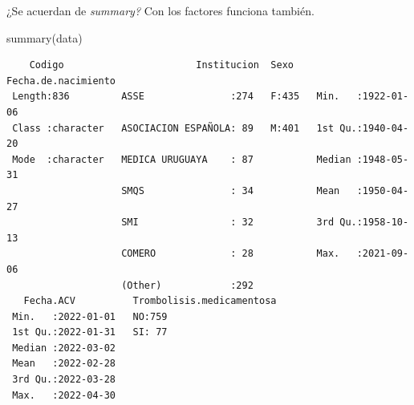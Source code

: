 \documentclass[
  letterpaper,
  DIV=11,
  numbers=noendperiod]{scrreprt}
\newenvironment{Shaded}{\begin{snugshade}}{\end{snugshade}}
\newcommand{\FunctionTok}[1]{\textcolor[rgb]{0.28,0.35,0.67}{#1}}
\newcommand{\NormalTok}[1]{\textcolor[rgb]{0.00,0.23,0.31}{#1}}
\newcommand{\OtherTok}[1]{\textcolor[rgb]{0.00,0.23,0.31}{#1}}
\newcommand{\SpecialCharTok}[1]{\textcolor[rgb]{0.37,0.37,0.37}{#1}}
\begin{document}
\begin{Shaded}
\end{Shaded}

¿Se acuerdan de \emph{summary?} Con los factores funciona también.

\begin{Shaded}
\begin{Highlighting}[]
\FunctionTok{summary}\NormalTok{(data)}
\end{Highlighting}
\end{Shaded}

\begin{verbatim}
    Codigo                       Institucion  Sexo    Fecha.de.nacimiento 
 Length:836         ASSE               :274   F:435   Min.   :1922-01-06  
 Class :character   ASOCIACION ESPAÑOLA: 89   M:401   1st Qu.:1940-04-20  
 Mode  :character   MEDICA URUGUAYA    : 87           Median :1948-05-31  
                    SMQS               : 34           Mean   :1950-04-27  
                    SMI                : 32           3rd Qu.:1958-10-13  
                    COMERO             : 28           Max.   :2021-09-06  
                    (Other)            :292                               
   Fecha.ACV          Trombolisis.medicamentosa
 Min.   :2022-01-01   NO:759                   
 1st Qu.:2022-01-31   SI: 77                   
 Median :2022-03-02                            
 Mean   :2022-02-28                            
 3rd Qu.:2022-03-28                            
 Max.   :2022-04-30                            
                                               
\end{verbatim}

\end{document}
